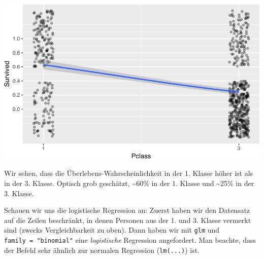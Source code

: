 \documentclass[12pt,]{book}
\newenvironment{Shaded}{\begin{snugshade}}{\end{snugshade}}
\newcommand{\KeywordTok}[1]{\textcolor[rgb]{0.13,0.29,0.53}{\textbf{{#1}}}}
\newcommand{\DataTypeTok}[1]{\textcolor[rgb]{0.13,0.29,0.53}{{#1}}}
\newcommand{\DecValTok}[1]{\textcolor[rgb]{0.00,0.00,0.81}{{#1}}}
\newcommand{\StringTok}[1]{\textcolor[rgb]{0.31,0.60,0.02}{{#1}}}
\newcommand{\CommentTok}[1]{\textcolor[rgb]{0.56,0.35,0.01}{\textit{{#1}}}}
\newcommand{\NormalTok}[1]{{#1}}
\begin{document}
\begin{Shaded}
\end{Shaded}

\begin{center}\includegraphics[width=0.7\linewidth]{075_Fallstudie_Titanic_files/figure-latex/fig-titanic-1} \end{center}

Wir sehen, dass die Überlebens-Wahrscheinlichkeit in der 1. Klasse höher
ist als in der 3. Klasse. Optisch grob geschätzt, \textasciitilde{}60\%
in der 1. Klasse und \textasciitilde{}25\% in der 3. Klasse.

Schauen wir uns die logistische Regression an: Zuerst haben wir den
Datensatz auf die Zeilen beschränkt, in denen Personen aus der 1. und 3.
Klasse vermerkt sind (zwecks Vergleichbarkeit zu oben). Dann haben wir
mit \texttt{glm} und \texttt{family\ =\ "binomial"} eine
\emph{logistische} Regression angefordert. Man beachte, dass der Befehl
sehr ähnlich zur normalen Regression (\texttt{lm(...)}) ist.
\end{document}
